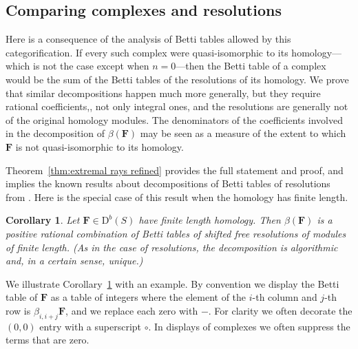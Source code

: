 \documentclass[12pt]{amsart}
\newtheorem{cor}[lemma]{Corollary}
\theoremstyle{definition}
\theoremstyle{remark}
\newcommand{\FF}{\mathbf{F}}
\newcommand{\DD}{\mathrm{D}}
\begin{document}
\subsection*{Comparing complexes and resolutions}
Here is a consequence of the analysis of Betti tables allowed by this categorification. If every such complex were quasi-isomorphic to its homology---which is not the case except when $n=0$---then the Betti table of a complex would be the sum of the Betti tables of the resolutions of its homology.  We prove that similar decompositions happen much more generally, but they require rational coefficients,, not only integral ones, and the resolutions are generally not of the original homology modules. The denominators of the coefficients involved in the decomposition of $\beta(\FF)$ may be seen as a measure of the extent to which $\FF$ is not quasi-isomorphic to its homology. 

Theorem~\ref{thm:extremal rays refined} provides the full statement and proof, and implies the known results about decompositions of Betti tables
of resolutions from \cites{eis-schrey1,boij-sod2}.  Here is the special case of this result when the homology has finite length. 
\begin{cor}\label{cor:decompose}
Let $\FF\in \DD^b(S)$ have finite length homology.  Then $\beta(\FF)$ is a positive rational combination of Betti tables of shifted free resolutions of modules of finite length. (As in the case of resolutions, the decomposition is algorithmic and, in a certain sense, unique.)
\end{cor}


We illustrate Corollary~\ref{cor:decompose} with an example.  By convention we display the Betti table of $\FF$ as a table
of integers where the element of the $i$-th column and $j$-th row is $\beta_{i,i+j}\FF$, and we replace each zero with $-$. For clarity we often decorate the $(0,0)$ entry
with a superscript $\circ$. In displays of complexes we often suppress the terms that are zero.
\end{document}
